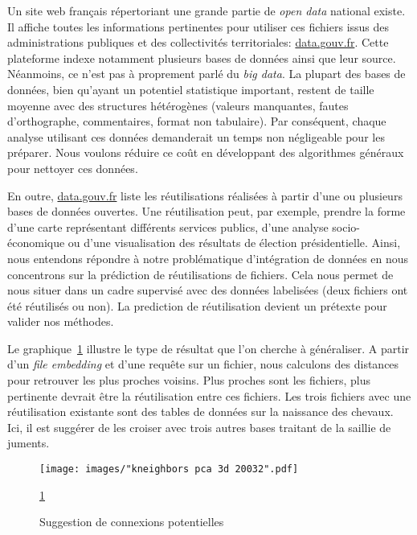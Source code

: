 \documentclass[a4paper]{article}
\begin{document}
	Un site web français répertoriant une grande partie de \emph{open data} national existe. Il affiche toutes les informations pertinentes pour utiliser ces fichiers issus des administrations publiques et des collectivités territoriales: \href{http://www.data.gouv.fr/fr/}{data.gouv.fr}. Cette plateforme indexe notamment plusieurs bases de données ainsi que leur source. Néanmoins, ce n'est pas à proprement parlé du \emph{big data}. La plupart des bases de données, bien qu'ayant un potentiel statistique important, restent de taille moyenne avec des structures hétérogènes (valeurs manquantes, fautes d'orthographe, commentaires, format non tabulaire). Par conséquent, chaque analyse utilisant ces données demanderait un temps non négligeable pour les préparer. Nous voulons réduire ce coût en développant des algorithmes généraux pour nettoyer ces données. 
	
	En outre, \href{http://www.data.gouv.fr/fr/}{data.gouv.fr} liste les réutilisations réalisées à partir d'une ou plusieurs bases de données ouvertes. Une réutilisation peut, par exemple, prendre la forme d'une carte représentant différents services publics, d'une analyse socio-économique ou d'une visualisation des résultats de élection présidentielle. Ainsi, nous entendons répondre à notre problématique d'intégration de données en nous concentrons sur la prédiction de réutilisations de fichiers. Cela nous permet de nous situer dans un cadre supervisé avec des données labelisées (deux fichiers ont été réutilisés ou non). La prediction de réutilisation devient un prétexte pour valider nos méthodes.
	
	Le graphique~\ref{fig:introduction} illustre le type de résultat que l'on cherche à généraliser. A partir d'un \emph{file embedding} et d'une requête sur un fichier, nous calculons des distances pour retrouver les plus proches voisins. Plus proches sont les fichiers, plus pertinente devrait être la réutilisation entre ces fichiers. Les trois fichiers avec une réutilisation existante sont des tables de données sur la naissance des chevaux. Ici, il est suggérer de les croiser avec trois autres bases traitant de la saillie de juments. 
	
	\begin{figure}[]
		\texttt{[image: images/"kneighbors pca 3d 20032".pdf]}
		\caption{Suggestion de connexions potentielles}
		\label{fig:introduction}
		\ref{fig:introduction}
	\end{figure}
	
\end{document}

